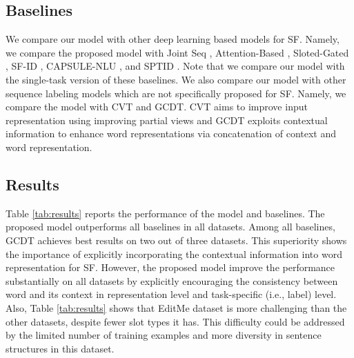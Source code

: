 \documentclass[11pt,a4paper]{article}
\begin{document}
\subsection{Baselines}
We compare our model with other deep learning based models for SF. Namely, we compare the proposed model with Joint Seq \cite{hakkani:16}, Attention-Based \cite{liu:16}, Sloted-Gated \cite{goo:18}, SF-ID \cite{e:19}, CAPSULE-NLU \cite{zhang:19}, and SPTID \cite{qin:19}. Note that we compare our model with the single-task version of these baselines. We also compare our model with other sequence labeling models which are not specifically proposed for SF. Namely, we compare the model with CVT\cite{clark:18} and GCDT\cite{Liu:19}. CVT aims to improve input representation using improving partial views and GCDT exploits contextual information to enhance word representations via concatenation of context and word representation. 

\subsection{Results}
Table \ref{tab:results} reports the performance of the model and baselines. The proposed model outperforms all baselines in all datasets. Among all baselines, GCDT achieves best results on two out of three datasets. This superiority shows the importance of explicitly incorporating the contextual information into word representation for SF. However, the proposed model improve the performance substantially on all datasets by explicitly encouraging the consistency between word and its context in representation level and task-specific (i.e., label) level. Also, Table \ref{tab:results} shows that EditMe dataset is more challenging than the other datasets, despite fewer slot types it has. This difficulty could be addressed by the limited number of training examples and more diversity in sentence structures in this dataset.
\end{document}
